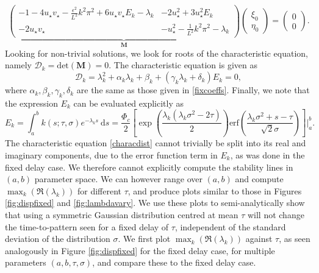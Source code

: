 \begin{equation}
\underbrace{\begin{pmatrix}-1-4u_\star v_\star-\frac{\epsilon^2}{L^2}k^2\pi^2+6u_\star v_\star E_k-\lambda_k&-2u_\star^2+3u_\star^2E_k\\-2u_\star v_\star&-u_\star^2-\frac{1}{L^2}k^2\pi^2-\lambda_k \end{pmatrix}}_{\textbf{M}}\begin{pmatrix}\xi_0\\\eta_0\end{pmatrix}=\begin{pmatrix}0\\0\end{pmatrix}.
\end{equation}
Looking for non-trivial solutions, we look for roots of the characteristic equation, namely $\mathcal{D}_k=\text{det}(\textbf{M})=0$. The characteristic equation is given as
\begin{equation}\label{characdist}
  \mathcal{D}_k=\lambda_k^2+\alpha_k\lambda_k+\beta_k+(\gamma_k\lambda_k+\delta_k)E_k=0,
\end{equation}
where $\alpha_k,\beta_k,\gamma_k,\delta_k$ are the same as those given in \eqref{fixcoeffs}. Finally, we note that the expression $E_k$ can be evaluated explicitly as
\begin{equation}
E_k=\int_a^bk(s;\tau,\sigma)e^{-\lambda_k s}\ \text{d}s=\frac{\Phi_c}{2}\left[\exp\left(\frac{\lambda_k(\lambda_k\sigma^2-2\tau)}{2}\right) \text{erf} \left(\frac{\lambda_k\sigma^2+s-\tau}{\sqrt{2}\sigma}\right)\right]\Bigg|_a^b.
\end{equation}
The characteristic equation \eqref{characdist} cannot trivially be split into its real and imaginary components, due to the error function term in $E_k$, as was done in the fixed delay case. We therefore cannot explicitly compute the stability lines in $(a,b)$ parameter space. We can however range over $(a,b)$ and compute $\max_k(\Re(\lambda_k))$ for different $\tau$, and produce plots similar to those in Figures \ref{fig:dispfixed} and \ref{fig:lambdavary}. We use these plots to semi-analytically show that using a symmetric Gaussian distribution centred at mean $\tau$ will not change the time-to-pattern seen for a fixed delay of $\tau$, independent of the standard deviation of the distribution $\sigma$. We first plot $\max_k(\Re(\lambda_k))$ against $\tau$, as seen analogously in Figure \ref{fig:dispfixed} for the fixed delay case, for multiple parameters $(a,b,\tau,\sigma)$, and compare these to the fixed delay case.

